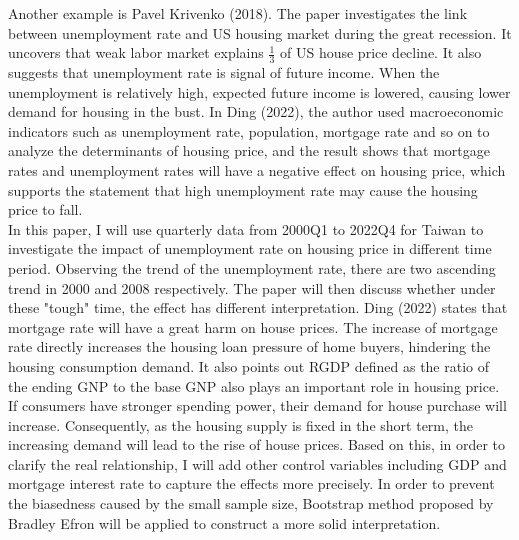 \documentclass[12pt]{article}
\begin{document}
\begin{spacing}{2}
\hspace*{1cm}Another example is Pavel Krivenko (2018). The paper investigates the link between unemployment rate and US housing market during the great recession. It uncovers that weak labor market explains $\frac{1}{3}$ of US house price decline. It also suggests that unemployment rate is signal of future income. When the unemployment is relatively high, expected future income is lowered, causing lower demand for housing in the bust.
In Ding (2022), the author used macroeconomic indicators such as unemployment rate, population, mortgage rate and so on to analyze the determinants of housing price, and the result shows that mortgage rates and unemployment rates will have a negative effect on housing price, which supports the statement that high unemployment rate may cause the housing price to fall. \\
\hspace*{1cm}In this paper, I will use quarterly data from 2000Q1 to 2022Q4 for Taiwan to investigate the impact of unemployment rate on housing price in different time period. Observing the trend of the unemployment rate, there are two ascending trend in 2000 and 2008 respectively. The paper will then discuss whether under these "tough" time, the effect has different interpretation. Ding (2022) states that mortgage rate will have a great harm on house prices. The increase of mortgage rate directly increases the housing loan pressure of home buyers, hindering the housing consumption demand. It also points out RGDP defined as the ratio of the ending GNP to the base GNP also plays an important role in housing price. If consumers have stronger spending power, their demand for house purchase will increase. Consequently, as the housing supply is fixed in the short term, the increasing demand will lead to the rise of house prices. Based on this, in order to clarify the real relationship, I will add other control variables including GDP and mortgage interest rate to capture the effects more precisely. In order to prevent the biasedness caused by the small sample size, Bootstrap method proposed by Bradley Efron will be applied to construct a more solid interpretation.
\newpage

\end{spacing}
\end{document}
